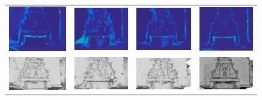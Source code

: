 \begin{figure}[t]
\setlength{\tabcolsep}{1px}
\centering
\begin{tabular}{cccc}
\includegraphics[width=0.22\columnwidth]{./img/errorPoisson}&
\includegraphics[width=0.22\columnwidth]{./img/errorMyFountainInit}&
\includegraphics[width=0.22\columnwidth]{./img/errorMyFountainNotSm}&
\includegraphics[width=0.22\columnwidth]{./img/Photofount}\\
\includegraphics[width=0.22\columnwidth]{./img/poissonUntex}&
\includegraphics[width=0.22\columnwidth]{./img/firstUntex}&
\includegraphics[width=0.22\columnwidth]{./img/myResUntex}&
\includegraphics[width=0.22\columnwidth]{./img/photo_mesh_crop}\\

\end{tabular}
\end{figure}
